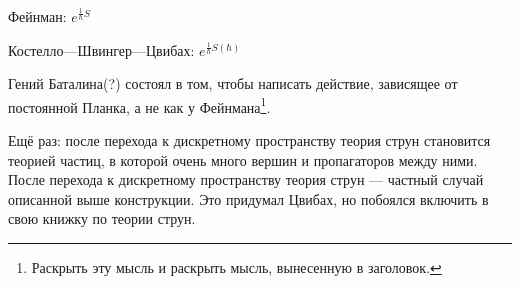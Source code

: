 \documentclass[11pt]{article}
\theoremstyle{remark}
\theoremstyle{definition}
\newcommand{\que}[1]{\footnote{\textcolor[rgb]{0.38,0.69,0.82}{#1}}}
\begin{document}
\begin{center}

Фейнман: $e^{\frac{1}{\hbar} S}$

Костелло---Швингер---Цвибах: $e^{\frac{1}{\hbar} S(\hbar)}$

\end{center}

Гений Баталина(?) состоял в том, чтобы написать действие, зависящее от постоянной Планка, а не как у Фейнмана\que{Раскрыть эту мысль и раскрыть мысль, вынесенную в заголовок.}.

Ещё раз: после перехода к дискретному пространству теория струн становится теорией частиц, в которой очень много вершин и пропагаторов между ними. После перехода к дискретному пространству теория струн --- частный случай описанной выше конструкции. Это придумал Цвибах, но побоялся включить в свою книжку по теории струн. 


\bigskip
\bigskip


 
\end{document}
